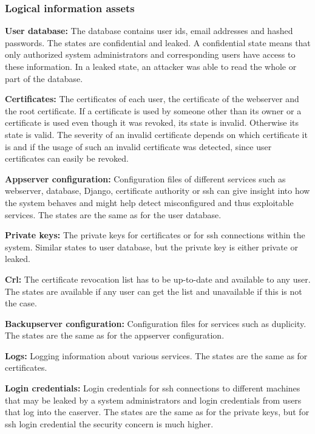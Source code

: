 \documentclass[english]{article}
\begin{document}
\subsubsection{Logical information assets}
	\begin{description}
		\item{\textbf{User database:}} The database contains user ids, email addresses and hashed passwords. The states are confidential and leaked. A confidential state means that only authorized system administrators and corresponding users have access to these information. In a leaked state, an attacker was able to read the whole or part of the database.
		\item{\textbf{Certificates:}} The certificates of each user, the certificate of the webserver and the root certificate. If a certificate is used by someone other than its owner or a certificate is used even though it was revoked, its state is invalid. Otherwise its state is valid. The severity of an invalid certificate depends on which certificate it is and if the usage of such an invalid certificate was detected, since user certificates can easily be revoked.
		\item{\textbf{Appserver configuration:}} Configuration files of different services such as webserver, database, Django, certificate authority or ssh can give insight into how the system behaves and might help detect misconfigured and thus exploitable services. The states are the same as for the user database.
		\item{\textbf{Private keys:}} The private keys for certificates or for ssh connections within the system. Similar states to user database, but the private key is either private or leaked.
		\item{\textbf{Crl:}} The certificate revocation list has to be up-to-date and available to any user. The states are available if any user can get the list and unavailable if this is not the case.
		\item{\textbf{Backupserver configuration:}} Configuration files for services such as duplicity. The states are the same as for the appserver configuration.
		\item{\textbf{Logs:}} Logging information about various services. The states are the same as for certificates.
		\item{\textbf{Login credentials:}} Login credentials for ssh connections to different machines that may be leaked by a system administrators and login credentials from users that log into the caserver. The states are the same as for the private keys, but for ssh login credential the security concern is much higher.

\end{description}
\end{document}
